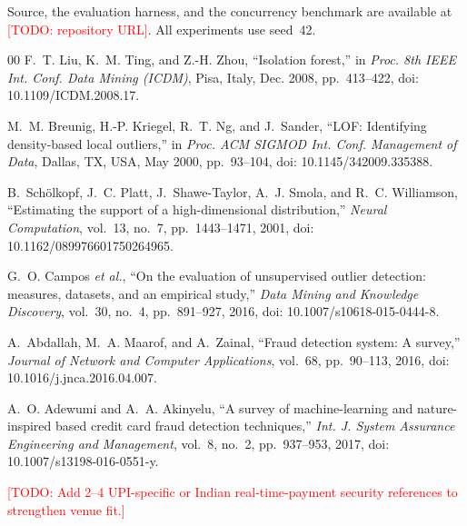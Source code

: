 \documentclass[conference]{IEEEtran}
\newcommand{\todo}[1]{\textcolor{red}{[TODO: #1]}}
\begin{document}
Source, the evaluation harness, and the concurrency benchmark are available
at \todo{repository URL}. All experiments use seed~42.

\begin{thebibliography}{00}
 F.~T. Liu, K.~M. Ting, and Z.-H. Zhou, ``Isolation
forest,'' in \emph{Proc. 8th IEEE Int. Conf. Data Mining (ICDM)}, Pisa,
Italy, Dec. 2008, pp.~413--422, doi: 10.1109/ICDM.2008.17.

 M.~M. Breunig, H.-P. Kriegel, R.~T. Ng, and
J.~Sander, ``LOF: Identifying density-based local outliers,'' in \emph{Proc.
ACM SIGMOD Int. Conf. Management of Data}, Dallas, TX, USA, May 2000,
pp.~93--104, doi: 10.1145/342009.335388.

 B.~Sch\"{o}lkopf, J.~C. Platt, J.~Shawe-Taylor,
A.~J. Smola, and R.~C. Williamson, ``Estimating the support of a
high-dimensional distribution,'' \emph{Neural Computation}, vol.~13,
no.~7, pp.~1443--1471, 2001, doi: 10.1162/089976601750264965.

 G.~O. Campos \emph{et al.}, ``On the evaluation of
unsupervised outlier detection: measures, datasets, and an empirical
study,'' \emph{Data Mining and Knowledge Discovery}, vol.~30, no.~4,
pp.~891--927, 2016, doi: 10.1007/s10618-015-0444-8.

 A.~Abdallah, M.~A. Maarof, and A.~Zainal, ``Fraud
detection system: A survey,'' \emph{Journal of Network and Computer
Applications}, vol.~68, pp.~90--113, 2016,
doi: 10.1016/j.jnca.2016.04.007.

 A.~O. Adewumi and A.~A. Akinyelu, ``A survey of
machine-learning and nature-inspired based credit card fraud detection
techniques,'' \emph{Int. J. System Assurance Engineering and Management},
vol.~8, no.~2, pp.~937--953, 2017, doi: 10.1007/s13198-016-0551-y.

\todo{Add 2--4 UPI-specific or Indian real-time-payment security
references to strengthen venue fit.}
\end{thebibliography}
\end{document}
